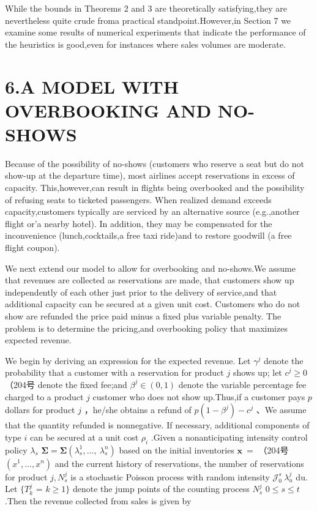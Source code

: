 While the bounds in Theorems 2 and 3 are theoretically satisfying,they
are nevertheless quite crude froma practical standpoint.However,in
Section 7 we examine some results of numerical experiments that indicate
the performance of the heuristics is good,even for instances where sales
volumes are moderate.

\section{6.A MODEL WITH OVERBOOKING AND
NO-SHOWS}\label{a-model-with-overbooking-and-no-shows}

Because of the possibility of no-shows (customers who reserve a seat but
do not show-up at the departure time), most airlines accept reservations
in excess of capacity. This,however,can result in flights being
overbooked and the possibility of refusing seats to ticketed passengers.
When realized demand exceeds capacity,customers typically are serviced
by an alternative source (e.g.,another flight or'a nearby hotel). In
addition, they may be compensated for the inconvenience
(lunch,cocktails,a free taxi ride)and to restore goodwill (a free flight
coupon).

We next extend our model to allow for overbooking and no-shows.We assume
that revenues are collected as reservations are made, that customers
show up independently of each other just prior to the delivery of
service,and that additional capacity can be secured at a given unit
cost. Customers who do not show are refunded the price paid minus a
fixed plus variable penalty. The problem is to determine the pricing,and
overbooking policy that maximizes expected revenue.

We begin by deriving an expression for the expected revenue. Let
\(\gamma ^ { j }\) denote the probability that a customer with a
reservation for product \(j\) shows up; let \(c ^ { j } \geqslant 0\)
（204号 denote the fixed fee;and \(\beta ^ { j } \in ( 0 , 1 )\) denote
the variable percentage fee charged to a product \(j\) customer who does
not show up.Thus,if a customer pays \(p\) dollars for product \(j\)
，he/she obtains a refund of \(p ( 1 - \beta ^ { j } ) - c ^ { j }\)
、We assume that the quantity refunded is nonnegative. If necessary,
additional components of type \(i\) can be secured at a unit cost
\(\rho _ { i }\) .Given a nonanticipating intensity control policy
\(\lambda _ { s }\)
\(\mathbf { \Sigma } = \mathbf { \Sigma } ( \lambda _ { s } ^ { 1 } , \ldots , \ \lambda _ { s } ^ { n } )\)
based on the initial inventories \(\boldsymbol { x } ~ =\) （204号
\(( x ^ { 1 } , \ldots , x ^ { n } )\) and the current history of
reservations, the number of reservations for product
\(j , N _ { s } ^ { j }\) is a stochastic Poisson process with random
intensity \(\mathcal { J } _ { 0 } ^ { s } \ \lambda _ { u } ^ { j }\)
du. Let \(\{ T _ { k } ^ { j }\) = \(k \geqslant 1 \}\) denote the jump
points of the counting process \(N _ { s } ^ { j }\)
\(0 \leqslant s \leqslant t\) .Then the revenue collected from sales is
given by

